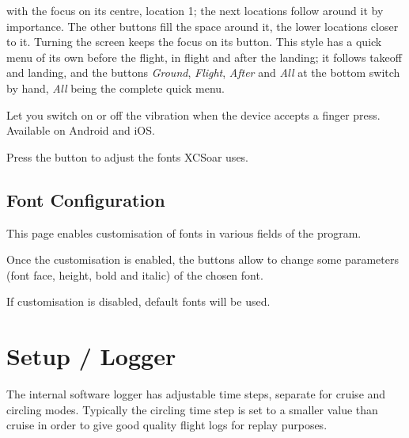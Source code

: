\begin{description}
  with the focus on its centre, location 1; the next locations follow
  around it by importance.  The other buttons fill the space around
  it, the lower locations closer to it.  Turning the screen keeps the
  focus on its button.  This style has a quick menu of its own before
  the flight, in flight and after the landing; it follows takeoff and
  landing, and the buttons \emph{Ground}, \emph{Flight}, \emph{After}
  and \emph{All} at the bottom switch by hand, \emph{All} being the
  complete quick menu.
\item[Haptic feedback*]  Let you switch on or off the vibration
  when the device accepts a finger press.  Available on Android
  and iOS.
\end{description}

Press the  button to adjust the fonts XCSoar uses.

\subsection*{Font Configuration}

This page enables customisation of fonts in various fields of the program.


Once the customisation is enabled, the  buttons allow to change 
some parameters (font face, height, bold and italic) of the chosen font.

If customisation is disabled, default fonts will be used.


\section{Setup / Logger} \label{conf:logger}

The internal software logger has adjustable time steps, separate for
cruise and circling modes.  
Typically the circling time step is set to a smaller value
than cruise in order to give good quality flight logs for replay
purposes.

